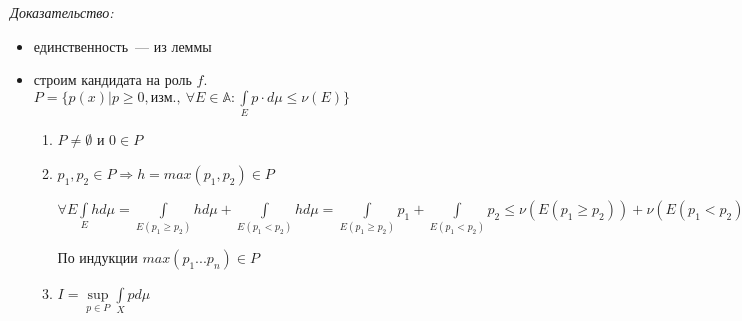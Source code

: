 \documentclass[paper=a4, fontsize=14pt]{report}
\begin{document}
\emph{Доказательство:}
		\begin{itemize}
			\item единственность~--- из леммы
			\item строим кандидата на роль $f$. $P = \{p(x) | p \geq 0, \text{изм.},\ \forall E \in \mathbb{A} : \int\limits_E p \cdot d\mu \leq \nu(E)\}$
			\begin{enumerate}
				\item
				$P \neq \emptyset$ и $0 \in P$
				\item
				$p_1, p_2 \in P \Rightarrow h = max(p_1, p_2) \in P$

				$\forall E \int\limits_E h d\mu = \int\limits_{E(p_1 \geq p_2)} h d\mu + \int\limits_{E(p_1 < p_2)} h d\mu =
				\int\limits_{E(p_1 \geq p_2)} p_1 + \int\limits_{E(p_1 < p_2)} p_2 \leq \nu(E(p_1 \geq p_2)) + \nu(E(p_1 < p_2)) = \nu E$

				По индукции $max(p_1...p_n)\in P$
				\item
				$I = \sup\limits_{p \in P} \int\limits_X p d\mu$


\end{enumerate}
\end{itemize}
\end{document}
